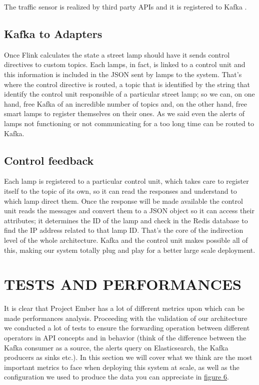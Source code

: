 The traffic sensor is realized by third party APIs and it is registered to Kafka .

\subsection{Kafka to Adapters}
Once Flink calculates the state a street lamp should have it sends control directives to custom topics. Each lamps, in fact, is linked to a control unit and this information is included in the JSON sent by lamps to the system. That’s where the control directive is routed, a topic that is identified by the string that identify the control unit responsible of a particular street lamp; so we can, on one hand, free Kafka of an incredible number of topics and, on the other hand, free smart lamps to register themselves on their ones. As we said even the alerts of lamps not functioning or not communicating for a too long time can be routed to Kafka.

\subsection{Control feedback}
Each lamp is registered to a particular control unit, which takes care to register itself to the topic of its own, so it can read the responses and understand to which lamp direct them. Once the response will be made available the control unit reads the messages and convert them to a JSON object so it can access their attributes; it determines the ID of the lamp and check in the Redis database to find the IP address related to that lamp ID. That’s the core of the indirection level of the whole architecture. Kafka and the control unit makes possible all of this, making our system totally plug and play for a better large scale deployment.
 
\section{TESTS AND PERFORMANCES}
It is clear that Project Ember has a lot of different metrics upon which can be made performances analysis. Proceeding with the validation of our architecture we conducted a lot of tests to ensure the forwarding operation between different operators in API concepts and in behavior (think of the difference between the Kafka consumer as a source, the alerts query on Elasticsearch, the Kafka producers as sinks etc.). In this section we will cover what we think are the most important metrics to face when deploying this system at scale, as well as the configuration we used to produce the data you can appreciate in \hyperref[fig:ember_metrics]{figure 6}.

